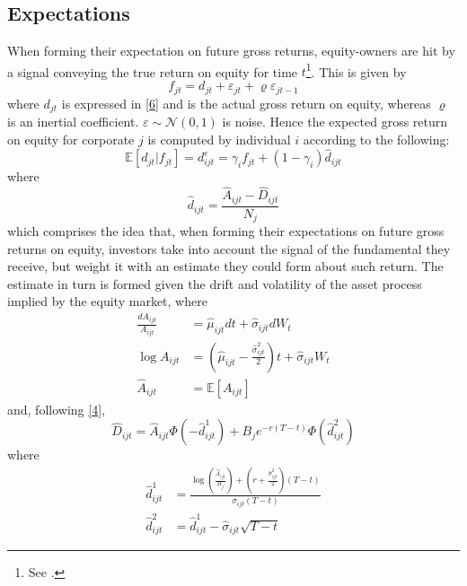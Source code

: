 \documentclass[11pt]{article}
\begin{document}
\subsection{Expectations}
When forming their expectation on future gross returns, equity-owners are hit by a signal conveying the true return on equity for time $t$\footnote{See \citet{4}.}. This is given by 
\begin{equation}\label{9}
	f_{jt} = d_{jt} + \varepsilon_{jt} + \varrho \varepsilon_{jt-1}
\end{equation}
where $d_{jt}$ is expressed in \eqref{6} and is the actual gross return on equity, whereas $\varrho$ is an inertial coefficient. $\varepsilon\sim \mathcal{N}(0,1)$ is noise. Hence the expected gross return on equity for corporate $j$ is computed by individual $i$ according to the following:
\begin{equation}\label{10}
	\mathbb{E}[d_{jt} | f_{jt}] = d^e_{ijt} = \gamma_i f_{jt} + (1-\gamma_i) \hat{d}_{ijt}
\end{equation}
where 
\begin{equation}\label{11}
	\hat{d}_{ijt} = \frac{\hat{A}_{ijt} - \hat{D}_{ijt}}{N_j}
\end{equation}
which comprises the idea that, when forming their expectations on future gross returns on equity, investors take into account the signal of the fundamental they receive, but weight it with an estimate they could form about such return. The estimate in turn is formed given the drift and volatility of the asset process implied by the equity market, where
\begin{equation}\label{12}
\begin{aligned}
	\frac{dA_{ijt}}{A_{ijt}} &= \hat{\mu}_{ijt} dt + \hat{\sigma}_{ijt} dW_t \\
	\log A_{ijt} &= \left ( \hat{\mu}_{ijt} - \frac{\hat{\sigma}^2_{ijt}}{2} \right )t + \hat{\sigma}_{ijt} W_t\\
	\hat{A}_{ijt} &= \mathbb{E}[A_{ijt}]
\end{aligned}
\end{equation}
and, following \eqref{4}, 
\begin{equation}\label{13}
\hat{D}_{ijt} = \hat{A}_{ijt} \Phi(-\hat{d}_{ijt}^1) + B_j e^{-r(T-t)} \Phi(\hat{d}_{ijt}^2)
\end{equation}
where 
\begin{subequations}\label{13}
\begin{align}
	\hat{d}^1_{ijt} &= \frac{
					\log \left ( \frac{\hat{A}_{ijt}}{B_{j}} \right ) + \left ( r + \frac{\hat{\sigma}_{ijt}^2}{2} \right ) (T-t)
					}{\hat{\sigma}_{ijt}(T-t)} \label{13a}\\
	\hat{d}^2_{ijt} &= \hat{d}^1_{ijt} - \hat{\sigma}_ {ijt}\sqrt{T-t} \label{13b}
\end{align}
\end{subequations}
\end{document}

